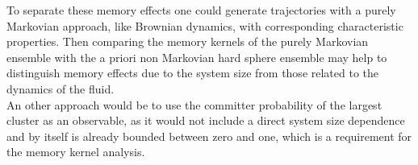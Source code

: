To separate these memory effects one could generate trajectories with a purely Markovian approach, like Brownian dynamics, with corresponding characteristic properties. Then comparing the memory kernels of the purely Markovian ensemble with the a priori non Markovian hard sphere ensemble may help to distinguish memory effects due to the system size from those related to the dynamics of the fluid.\\

An other approach would be to use the committer probability of the largest cluster as an observable, as it would not include a direct system size dependence and by itself is already bounded between zero and one, which is a requirement for the memory kernel analysis.
